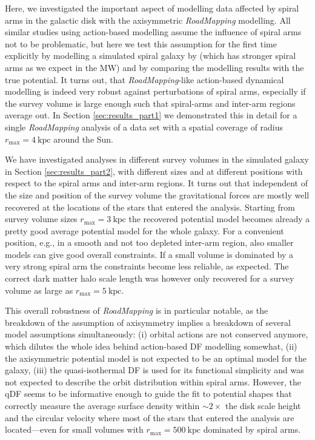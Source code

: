 \documentclass[iop,revtex4,numberedappendix,appendixfloats]{emulateapj}
\newcommand{\RM}{{\sl RoadMapping}}
\begin{document}
Here, we investigated the important aspect of modelling data affected by spiral arms in the galactic disk with the axisymmetric \RM{} modelling. All similar studies using action-based modelling assume the influence of spiral arms not to be problematic, but here we test this assumption for the first time explicitly by modelling a simulated spiral galaxy by \citet{2013ApJ...766...34D} (which has stronger spiral arms as we expect in the MW) and by comparing the modelling results with the true potential. It turns out, that \RM{}-like action-based dynamical modelling is indeed very robust against perturbations of spiral arms, especially if the survey volume is large enough such that spiral-arms and inter-arm regions average out. In Section \ref{sec:results_part1} we demonstrated this in detail for a single \RM{} analysis of a data set with a spatial coverage of radius $r_\text{max}=4~\text{kpc}$ around the Sun.

We have investigated analyses in different survey volumes in the simulated galaxy in Section \ref{sec:results_part2}, with different sizes and at different positions with respect to the spiral arms and inter-arm regions. It turns out that independent of the size and position of the survey volume the gravitational forces are mostly well recovered at the locations of the stars that entered the analysis. Starting from survey volume sizes $r_\text{max}=3~\text{kpc}$ the recovered potential model becomes already a pretty good average potential model for the whole galaxy. For a convenient position, e.g., in a smooth and not too depleted inter-arm region, also smaller models can give good overall constraints. If a small volume is dominated by a very strong spiral arm the constraints become less reliable, as expected. The correct dark matter halo scale length was however only recovered for a survey volume as large as $r_\text{max}=5~\text{kpc}$. 

This overall robustness of \RM{} is in particular notable, as the breakdown of the assumption of axisymmetry implies a breakdown of several model assumptions simultaneously: (i) orbital actions are not conserved anymore, which dilutes the whole idea behind action-based DF modelling somewhat, (ii) the axisymmetric potential model is not expected to be an optimal model for the galaxy, (iii) the quasi-isothermal DF is used for its functional simplicity and was not expected to describe the orbit distribution within spiral arms. However, the qDF seems to be informative enough to guide the fit to potential shapes that correctly measure the average surface density within $\sim2 \times$ the disk scale height and the circular velocity where most of the stars that entered the analysis are located---even for small volumes with $r_\text{max}=500~\text{kpc}$ dominated by spiral arms.
\end{document}
